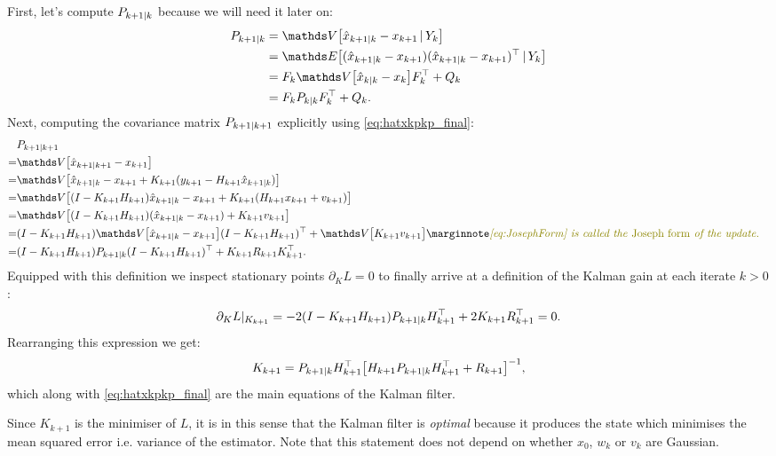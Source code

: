 First, let's compute $P_{k+1|k}$ because we will need it later on:
\begin{align}
\Pkpk & = \covariance{\hatxkpk - x_{k+1}\given Y_k} \\
& = \expect{(\hatxkpk - x_{k+1})(\hatxkpk - x_{k+1})\transp\given Y_k}\\
& = F_k\covariance{\hatxkk - x_k}F_k\transp + Q_k\\
& = F_k \Pkk F_k\transp + Q_k.
\end{align}
Next, computing the covariance matrix $P_{k+1|k+1}$ explicitly using \eqref{eq:hatxkpkp_final}:
\begin{align}
& \Pkpkp\\
= & \covariance{\hatxkpkp - x_{k+1}}\\
= & \covariance{\hatxkpk - x_{k+1} + K_{k+1}(\ykp - H_{k+1}\hatxkpk)}\\
= & \covariance{(I - K_{k+1} H_{k+1})\hatxkpk - x_{k+1} + K_{k+1}(H_{k+1}\xkp + v_{k+1})}\\
= & \covariance{(I - K_{k+1} H_{k+1})(\hatxkpk - x_{k+1}) + K_{k+1}v_{k+1}}\\
= & (I - K_{k+1} H_{k+1})\covariance{\hatxkpk - x_{k+1}}(I - K_{k+1} H_{k+1})\transp + \covariance{ K_{k+1}v_{k+1}}\text{\mymarginnote{\eqref{eq:JosephForm} is called the \emph{Joseph form}
of the update.}
}\\
= & (I - K_{k+1} H_{k+1})\Pkpk(I - K_{k+1} H_{k+1})\transp + K_{k+1}R_{k+1}K_{k+1}\transp.\label{eq:JosephForm}
\end{align} 
Equipped with this definition we inspect stationary points $\partial_K L = 0$ to finally 
arrive at a definition of the Kalman gain at each iterate $k>0$:
\begin{align*}
\partial_K L|_{K_{k+1}}= -2 (I - K_{k+1} H_{k+1}) P_{k+1|k} H_{k+1}^\top + 2K_{k+1}R_{k+1}^\top = 0.
\end{align*}
Rearranging this expression we get:
\begin{equation}\label{eq:KalmanGain}
K_{k+1} = P_{k+1|k} H_{k+1}^\top\big[H_{k+1}P_{k+1|k} H_{k+1}^\top + R_{k+1}\big]^{-1},
\end{equation}
which along with \eqref{eq:hatxkpkp_final} are the main equations of the Kalman filter.
\begin{remark}[Optimality]
Since $K_{k+1}$ is the minimiser of $L$, it is in this sense that the Kalman filter is \emph{optimal}
because it produces the state which minimises the mean squared error i.e. variance of the estimator.
Note that this statement does not depend on whether $x_0$, $w_k$ or $v_k$ are Gaussian.
\end{remark}
